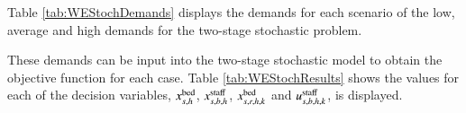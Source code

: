 \documentclass[../thesis.tex]{subfiles}
\begin{document}
Table \ref{tab:WEStochDemands} displays the demands for each scenario of the low, average and high demands for the two-stage stochastic problem. 



These demands can be input into the two-stage stochastic model to obtain the objective function for each case. Table \ref{tab:WEStochResults} shows the values for each of the decision variables, $x^{\textnormal{bed}}_{s,h}$, $x^{\textnormal{staff}}_{s,b,h}$, $x^{\textnormal{bed}}_{s,r,h,k}$ and $u^{\textnormal{staff}}_{s,b,h,k}$, is displayed.

\begin{landscape}
\begin{table}[h!]
    \centering{}
\end{table}
\end{landscape}
\end{document}

